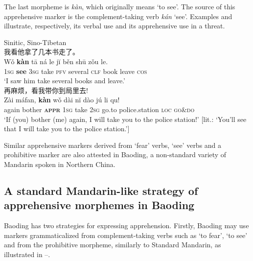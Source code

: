 \documentclass[output=paper,colorlinks,citecolor=brown, language=chinese]{langscibook}
\begin{document}
 The last morpheme is \textit{kàn}, which originally means `to see'. The source of this apprehensive marker is the complement-taking verb \textit{kán} `see'. Examples  and  illustrate, respectively, its verbal use and its apprehensive use in a threat.


\ea \label{ex:Song7} 
 {Sinitic, Sino-Tibetan} {\cite{Gao2003}} \\
\ea \label{ex:Song7a} {\cn 我看他拿了几本书走了。} \\
\gll Wǒ \textbf{kàn} tā ná le jĭ běn shū zǒu le. \\
\textsc{1sg} \textbf{see} \textsc{3sg} take \textsc{pfv} several \textsc{clf} book leave \textsc{cos} \\
\glt `I saw him take several books and leave.' \\
\ex \label{ex:Song7b} {\cn 再麻烦，看我带你到局里去!} \\
\gll Zài máfan, \textbf{kàn} wǒ dài nĭ dào jú li qu! \\
again bother \textsc{\textbf{appr}} \textsc{1sg} take \textsc{2sg} go.to police.station \textsc{loc} \textsc{go\&do} \\
\glt `If (you) bother (me) again, I will take you to the police station!'
[lit.: `You'll see that I will take you to the police station.']
\z
\z

 Similar apprehensive markers derived from `fear' verbs, `see' verbs and a prohibitive marker are also attested in Baoding, a non-standard variety of Mandarin spoken in Northern China.



\subsection{A standard Mandarin-like strategy of apprehensive morphemes in Baoding}
\label{subsec:apprbaoding}


Baoding has two strategies for expressing apprehension. Firstly, Baoding may use markers grammaticalized from complement-taking verbs such as `to fear', `to see' and from the prohibitive morpheme, similarly to Standard Mandarin, as illustrated in --.
\end{document}
